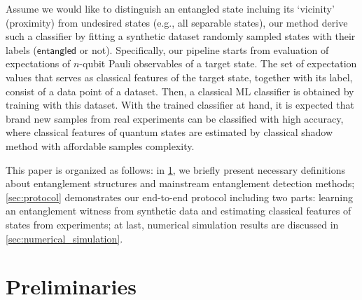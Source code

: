 \documentclass[
reprint,
aps,
pra,
floatfix,
]{revtex4-2}
\theoremstyle{plain}
\theoremstyle{definition}
\newtheorem{notation}{Notation}
\newcommand{\ew}{W}
\newcommand{\ob}{O}
\newcommand{\dm}{\rho}
\newcommand{\entangled}{\textsf{entangled}}
\newcommand{\hamiltonian}{\hat{H}}
\begin{document}
Assume we would like to distinguish an entangled state incluing its `vicinity' (proximity) from undesired states (e.g., all separable states), our method derive such a classifier by fitting a synthetic dataset randomly sampled states with their labels ($\entangled$ or not).
Specifically, our pipeline starts from evaluation of expectations of $n$-qubit Pauli observables of a target state. 
The set of expectation values that serves as classical features of the target state, together with its label, consist of a data point of a dataset.
Then, a classical ML classifier is obtained by training with this dataset.
With the trained classifier at hand, it is expected that brand new samples from real experiments can be classified with high accuracy, 
where classical features of quantum states are estimated by classical shadow method \cite{huangPredictingManyProperties2020} with affordable samples complexity.

This paper is organized as follows: in \cref{sec:preliminaries}, we briefly present necessary definitions about entanglement structures and mainstream entanglement detection methods;
\cref{sec:protocol} demonstrates our end-to-end protocol including two parts: learning an entanglement witness from synthetic data and estimating classical features of states from experiments;
at last, numerical simulation results are discussed in \cref{sec:numerical_simulation}.

\section{Preliminaries}\label{sec:preliminaries}
\end{document}

